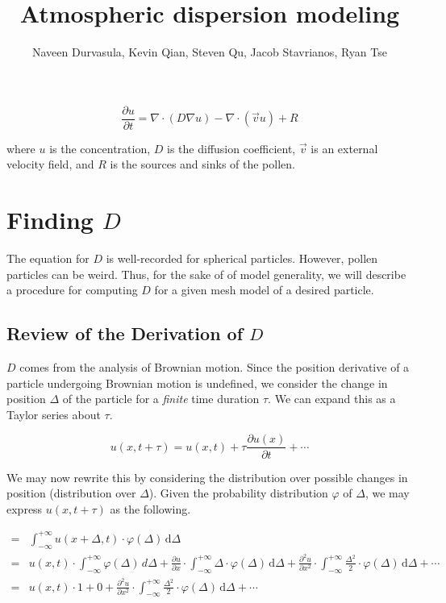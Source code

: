 \documentclass{article}
\title{Atmospheric dispersion modeling}
\author{Naveen Durvasula, Kevin Qian, Steven Qu, Jacob Stavrianos, Ryan Tse}
\renewcommand{\phi}{\varphi}
\begin{document}
\maketitle

\[ \frac{\partial u}{\partial t} = \nabla \cdot (D \nabla u) - \nabla \cdot (\vec{v} u) + R \]

where $u$ is the concentration, $D$ is the diffusion coefficient, $\vec{v}$ is an external velocity field, and $R$ is the sources and sinks of the pollen.

\section{Finding $D$}

The equation for $D$ is well-recorded for spherical particles. However, pollen particles can be weird. Thus, for the sake of of model generality, we will describe a procedure for computing $D$ for a given mesh model of a desired particle.

\subsection{Review of the Derivation of $D$}

$D$ comes from the analysis of Brownian motion. Since the position derivative of a particle undergoing Brownian motion is undefined, we consider the change in position $\Delta$ of the particle for a \textit{finite} time duration $\tau$. We can expand this as a Taylor series about $\tau$.

\[ u (x,t+\tau ) = u (x,t)+\tau {\frac {\partial u (x)}{\partial t}}+\cdots \] 

We may now rewrite this by considering the distribution over possible changes in position (distribution over $\Delta$). Given the probability distribution $\phi$ of $\Delta$, we may express $u(x, t+\tau)$ as the following.

$${\displaystyle {\begin{aligned} = {}&\int _{-\infty }^{+\infty } u (x+\Delta ,t)\cdot \varphi (\Delta )\,\mathrm {d} \Delta \\={}& u (x,t)\cdot \int _{-\infty }^{+\infty }\varphi (\Delta )\,d\Delta +{\frac {\partial u }{\partial x}}\cdot \int _{-\infty }^{+\infty }\Delta \cdot \varphi (\Delta )\,\mathrm {d} \Delta +{\frac {\partial ^{2}u }{\partial x^{2}}}\cdot \int _{-\infty }^{+\infty }{\frac {\Delta ^{2}}{2}}\cdot \varphi (\Delta )\,\mathrm {d} \Delta +\cdots \\={}&u (x,t)\cdot 1+0+{\frac {\partial ^{2}u }{\partial x^{2}}}\cdot \int _{-\infty }^{+\infty }{\frac {\Delta ^{2}}{2}}\cdot \varphi (\Delta )\,\mathrm {d} \Delta +\cdots \end{aligned}}}$$
\end{document}
